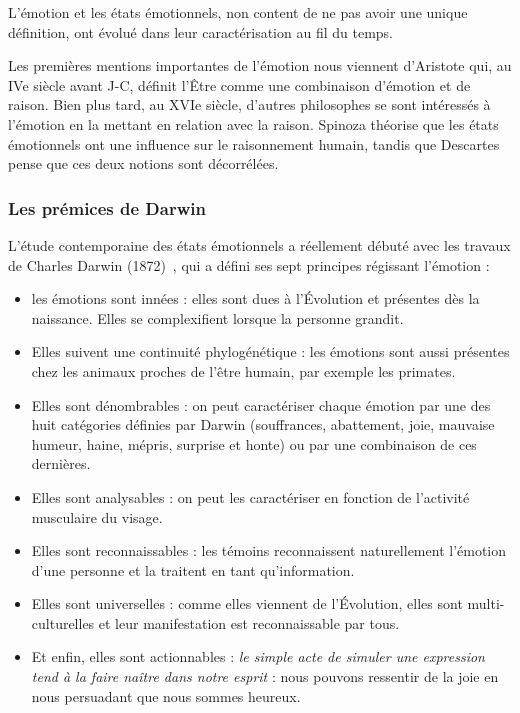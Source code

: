 L'émotion et les états émotionnels, non content de ne pas avoir une unique définition, ont évolué dans leur caractérisation au fil du temps.

Les premières mentions importantes de l'émotion nous viennent d'Aristote qui, au IVe siècle avant J-C, définit l'Être comme une combinaison d'émotion et de raison. Bien plus tard, au XVIe siècle, d'autres philosophes se sont intéressés à l'émotion en la mettant en relation avec la raison. Spinoza théorise que les états émotionnels ont une influence sur le raisonnement humain, tandis que Descartes pense que ces deux notions sont décorrélées.

\subsubsection{Les prémices de Darwin}
L'étude contemporaine des états émotionnels a réellement débuté avec les travaux de Charles Darwin (1872)~\cite{Darwin1872}, qui a défini ses sept principes régissant l'émotion :
\begin{itemize}
    \item les émotions sont innées : elles sont dues à l'Évolution et présentes dès la naissance. Elles se complexifient lorsque la personne grandit.
    \item Elles suivent une continuité phylogénétique : les émotions sont aussi présentes chez les animaux proches de l'être humain, par exemple les primates.
    \item Elles sont dénombrables : on peut caractériser chaque émotion par une des huit catégories définies par Darwin (souffrances, abattement, joie, mauvaise humeur, haine, mépris, surprise et honte) ou par une combinaison de ces dernières.
    \item Elles sont analysables : on peut les caractériser en fonction de l'activité musculaire du visage.
    \item Elles sont reconnaissables : les témoins reconnaissent naturellement l'émotion d'une personne et la traitent en tant qu'information.
    \item Elles sont universelles : comme elles viennent de l'Évolution, elles sont multi-culturelles et leur manifestation est reconnaissable par tous.
    \item Et enfin, elles sont actionnables : \textit{le simple acte de simuler une expression tend à la faire naître dans notre esprit} : nous pouvons ressentir de la joie en nous persuadant que nous sommes heureux.
\end{itemize}


